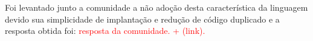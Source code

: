 Foi levantado junto a comunidade a não adoção desta característica da linguagem devido sua simplicidade de implantação e redução de código duplicado e a resposta obtida foi: \textcolor{red}{resposta da comunidade. + (link).}

\newpage



